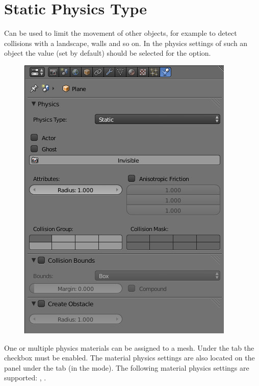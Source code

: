 \documentclass[a4paper,12pt,oneside]{sphinxmanual}
\begin{document}
\section{Static Physics Type}
\label{physics:id3}
Can be used to limit the movement of other objects, for example to detect collisions with a landscape, walls and so on. In the physics settings of such an object the  value (set by default) should be selected for the  option.
\begin{figure}[htbp]
\centering

\includegraphics[width=0.800\linewidth]{physics_panel_static.jpg}
\end{figure}

\begin{DUlineblock}{0em}
\item[] 
\end{DUlineblock}

One or multiple physics materials can be assigned to a mesh. Under the  tab the  checkbox must be enabled. The material physics settings are also located on the  panel under the  tab (in the  mode). The following material physics settings are supported: , .
\end{document}
